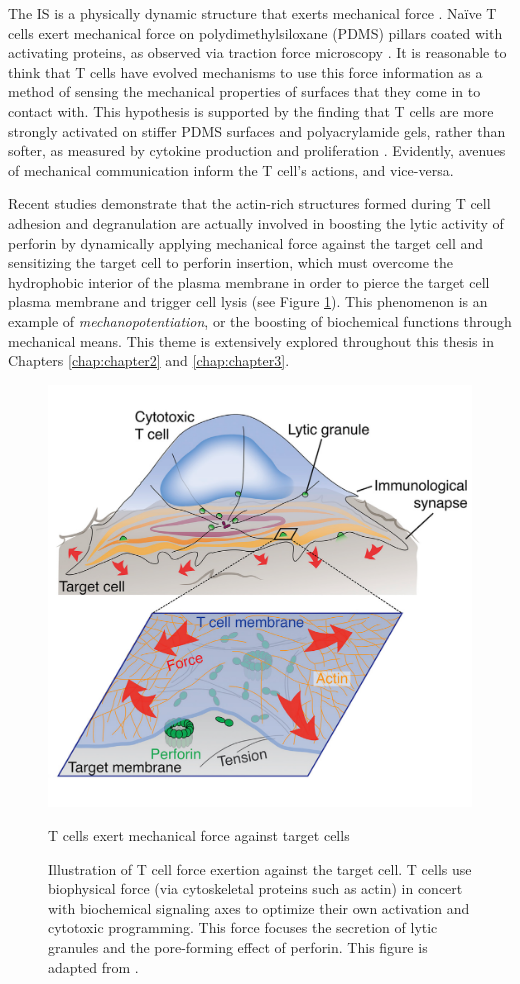 The IS is a physically dynamic structure that exerts mechanical force \cite{Ritter2015, Bashour2014}. Naïve T cells exert mechanical force on polydimethylsiloxane (PDMS) pillars coated with activating proteins, as observed via traction force microscopy \cite{Bashour2014}. It is reasonable to think that T cells have evolved mechanisms to use this force information as a method of sensing the mechanical properties of surfaces that they come in to contact with. This hypothesis is supported by the finding that T cells are more strongly activated on stiffer PDMS surfaces and polyacrylamide gels, rather than softer, as measured by cytokine production and proliferation \cite{Connor2012}. Evidently, avenues of mechanical communication inform the T cell's actions, and vice-versa.

Recent studies demonstrate that the actin-rich structures formed during T cell adhesion and degranulation are actually involved in boosting the lytic activity of perforin by dynamically applying mechanical force against the target cell \cite{Basu2016, Tamzalit2018} and sensitizing the target cell to perforin insertion, which must overcome the hydrophobic interior of the plasma membrane in order to pierce the target cell plasma membrane and trigger cell lysis (see Figure \ref{fig:mechforce}). This phenomenon is an example of \textit{mechanopotentiation}, or the boosting of biochemical functions through mechanical means. This theme is extensively explored throughout this thesis in Chapters \ref{chap:chapter2} and \ref{chap:chapter3}.

\begin{figure}[htbp]
	\centering
	\includegraphics[width=0.8\columnwidth]{../figures/chapter1/mechforce.png}
	\caption{T cells exert mechanical force against target cells}
	\caption*{Illustration of T cell force exertion against the target cell. T cells use biophysical force (via cytoskeletal proteins such as actin) in concert with biochemical signaling axes to optimize their own activation and cytotoxic programming.  This force focuses the secretion of lytic granules and the pore-forming effect of perforin. This figure is adapted from \cite{Rak2011}.}
	\label{fig:mechforce}
\end{figure}

